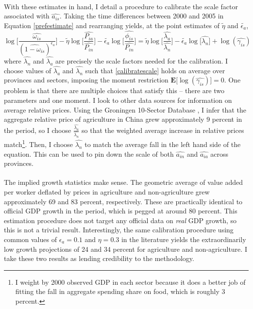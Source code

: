 \documentclass[]{article}
\theoremstyle{plain}
\begin{document}
\paragraph*{}
With these estimates in hand, I detail a procedure to calibrate the scale factor associated with $\hat{a_{is}}$. Taking the time differences between 2000 and 2005 in Equation \eqref{prefestimate} and rearranging yields, at the point estimates of $\tilde{\eta}$ and $\tilde{\epsilon_{a}}$,
\begin{equation}\label{calibratescale}
		\log\bigg[\frac{\hat{\omega_{is}}}{(\hat{1-\omega_{is}})^{\epsilon_{a}}}\bigg] - \tilde{\eta}\log\bigg[\frac{\hat{P_{ia}}}{\hat{P_{in}}}\bigg] - \tilde{\epsilon_{a}}\log\bigg[\frac{\hat{\phi_{is}}}{\hat{P_{in}}}\bigg] = \tilde{\eta}\log\bigg[\frac{\hat{\lambda_{a}}}{\hat{\lambda_{n}}}\bigg] - \tilde{\epsilon_{a}}\log\bigg[\hat{\lambda_{n}}\bigg] + \log(\hat{\gamma_{is}})
\end{equation}
where $\hat{\lambda_{n}}$ and $\hat{\lambda_{a}}$ are precisely the scale factors needed for the calibration. I choose values of $\hat{\lambda_{a}}$ and $\hat{\lambda_{n}}$ such that \eqref{calibratescale} holds on average over provinces and sectors, imposing the moment restriction $\mathbf{E}\big[\log(\hat{\gamma_{is}})\big] = 0$. One problem is that there are multiple choices that satisfy this -- there are two parameters and one moment. I look to other data sources for information on average relative prices. Using the Groningen 10-Sector Database \citep{10sector}, I infer that the aggregate relative price of agriculture in China grew approximately 9 percent in the period, so I choose $\frac{\hat{\lambda_{a}}}{\hat{\lambda_{n}}}$ so that the weighted average increase in relative prices match\footnote{I weight by 2000 observed GDP in each sector because it does a better job of fitting the fall in aggregate spending share on food, which is roughly 3 percent.}. Then, I choose $\hat{\lambda_{n}}$ to match the average fall in the left hand side of the equation. This can be used to pin down the scale of both $\hat{a_{in}}$ and $\hat{a_{ia}}$ across provinces.
\paragraph*{}
The implied growth statistics make sense. The geometric average of value added per worker deflated by prices in agriculture and non-agriculture grew approximately 69 and 83  percent, respectively. These are practically identical to official GDP growth in the period, which is pegged at around 80 percent. This estimation procedure does not target any official data on \textit{real} GDP growth, so this is not a trivial result.  Interestingly, the same calibration procedure using common values of $\epsilon_{a} = 0.1$ and $\eta = 0.3$ in the literature yields the extraordinarily low growth projections of 24 and 34 percent for agriculture and non-agriculture. I take these two results as lending credibility to the methodology.
\end{document}
